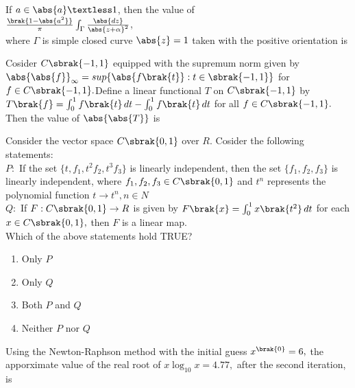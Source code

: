 \iffalse
    \author{EE24BTECH11029}
    \section{ma}
    \chapter{2014}
\fi

\item If $a\in \abs{a} \textless 1$, then the value of\\
    $\frac{\brak{1-\abs{a^2}}}{\pi}\int_{\Gamma}\frac{\abs{dz}}{{\abs{z+\alpha}}^2}$,\\
    where $\Gamma$ is simple closed curve $\abs{z}=1$ taken with the positive orientation is\\
    \item Cosider $C\sbrak{-1,1}$ equipped with the supremum norm given by $\abs{\abs{f}}_{\infty}=sup\{\abs{f\brak{t}}:t\in \sbrak{-1,1}\}$ for 
    $f\in C\sbrak{-1,1}.$Define a linear functional $T$ on $C\sbrak{-1,1}$ by $T\brak{f}=\int_{0}^{1}f\brak{t}\,dt-\int_{0}^{1}f\brak{t}\,dt$ for all $f\in C\sbrak{-1,1}.$Then the value of $\abs{\abs{T}}$ is\\
    \item Consider the vector space $C\sbrak{0,1}$ over $R$. Cosider the following statements:\\
    $P:$ If the set $\{t,f_1,t^2f_2,t^3f_3\}$ is linearly independent, then the set $\{f_1,f_2,f_3\}$ is linearly independent, where $f_1,f_2,f_3\in C\sbrak{0,1}$ and $t^n$ represents the polynomial function $t\rightarrow t^n,n\in N$\\
    $Q:$ If $F:C\sbrak{0,1}\rightarrow R$ is given by $F\brak{x}=\int_{0}^{1}x\brak{t^2}\,dt$ for each $x\in C\sbrak{0,1},$ then $F$ is a linear map.\\
    Which of the above statements hold TRUE?
    \begin{enumerate}
        \item Only $P$
        \item Only $Q$
        \item Both $P$ and $Q$
        \item Neither $P$ nor $Q$\\
    \end{enumerate}
    \item Using the Newton-Raphson method with the initial guess $x^{\brak{0}}=6,$ the apporximate value of the real root of $x\log_{10}x=4.77,$ after the second iteration, is\\
